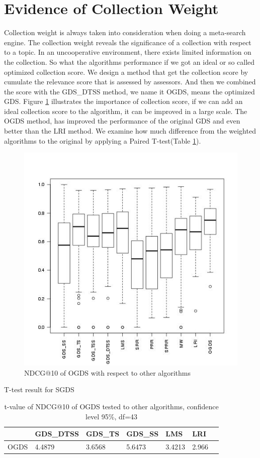 \section{Evidence of Collection Weight}

Collection weight is always taken into consideration when doing a meta-search engine. The collection weight reveals the significance of a collection with respect to a topic. In an uncooperative environment, there exists limited information on the collection. So what the algorithms performance if we got an ideal or so called optimized collection score. We design a method that get the collection score by cumulate the relevance score that is assessed by assessors. And then we combined the score with the GDS\_DTSS method, we name it OGDS, means the optimized GDS. Figure \ref{fig:ogds} illustrates the importance of collection score, if we can add an ideal collection score to the algorithm, it can be improved in a large scale. The OGDS method, has improved the performance of the original GDS and even better than the LRI method. We examine how much difference from the weighted algorithms to the original by applying a Paired T-test(Table \ref{tb:odstt}). 

\begin{figure}
\begin{center}
\includegraphics[scale=0.6]{images/OGDS}
\caption{NDCG@10 of OGDS with respect to other algorithms}
\label{fig:ogds}
\end{center}
\end{figure}
\begin{table}[h]
\caption{T-test result for SGDS}
\label{tb:odstt}
\centering
\begin{tabular}{lllllll}
\hline
  & GDS\_DTSS&GDS\_TS &GDS\_SS& LMS  & LRI     \\
\hline
 OGDS&4.4879 &3.6568&5.6473& 3.4213 & 2.966 \\ 
\end{tabular}
\caption{t-value of NDCG@10 of OGDS tested to other algorithms, confidence level 95\%, df=43}
\end{table}

